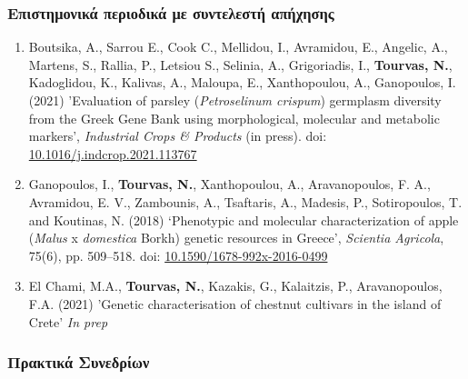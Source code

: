 \documentclass[12pt,]{scrartcl}
\begin{document}
\subsubsection{Επιστημονικά περιοδικά με συντελεστή απήχησης}\label{journals}
\vspace{-3mm}
\begin{enumerate}

\leftskip-0.07in

\item Boutsika, A., Sarrou E., Cook C., Mellidou, I., Avramidou, E., Angelic, A., Martens, S., Rallia, P., Letsiou S., Selinia, A., Grigoriadis, I., \textbf{Tourvas, N.}, Kadoglidou, K., Kalivas, A., Maloupa, E., Xanthopoulou, A., Ganopoulos, I. (2021) 'Evaluation of parsley (\textit{Petroselinum crispum}) germplasm diversity from the Greek Gene Bank using morphological, molecular and metabolic markers', \textit{Industrial Crops \& Products} (in press). doi: \href{https://doi.org/10.1016/j.indcrop.2021.113767}{10.1016/j.indcrop.2021.113767}

\item Ganopoulos, I., \textbf{Tourvas, N.}, Xanthopoulou, A., Aravanopoulos, F. A., Avramidou, E. V., Zambounis, A., Tsaftaris, A., Madesis, P., Sotiropoulos, T. and Koutinas, N. (2018) ‘Phenotypic and molecular characterization of apple (\textit{Malus} x \textit{domestica} Borkh) genetic resources in Greece’, \textit{Scientia Agricola}, 75(6), pp. 509–518. doi: \href{http://dx.doi.org/10.1590/1678-992x-2016-0499}{10.1590/1678-992x-2016-0499}

\item El Chami, M.A., \textbf{Tourvas, N.}, Kazakis, G., Kalaitzis, P., Aravanopoulos, F.A. (2021) 'Genetic characterisation of chestnut cultivars in the island of Crete' \textit{In prep}

\end{enumerate}


\subsubsection{Πρακτικά Συνεδρίων}\label{conferences}
\end{document}
